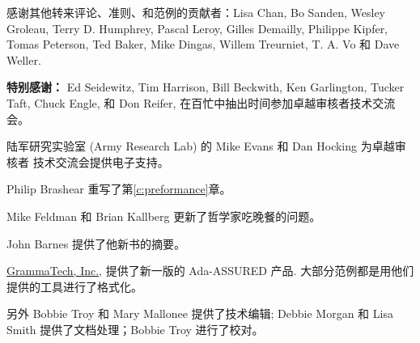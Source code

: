 感谢其他转来评论、准则、和范例的贡献者：Lisa Chan, Bo Sanden, Wesley Groleau,
Terry D. Humphrey, Pascal Leroy, Gilles Demailly, Philippe Kipfer, Tomas
Peterson, Ted Baker, Mike Dingas, Willem Treurniet, T. A. Vo 和 Dave Weller.

\textbf{特别感谢：} 
Ed Seidewitz, Tim Harrison, Bill Beckwith, Ken Garlington, Tucker Taft,
Chuck Engle, 和 Don Reifer, 在百忙中抽出时间参加卓越审核者技术交流会。

陆军研究实验室 (Army Research Lab) 的 Mike Evans 和 Dan Hocking 为卓越审核者
技术交流会提供电子支持。

Philip Brashear 重写了第\ref{c:preformance}章。

Mike Feldman 和 Brian Kallberg 更新了哲学家吃晚餐的问题。

John Barnes 提供了他新书的摘要。

\href{http://www.grammatech.com/}{GrammaTech, Inc.}, 提供了新一版的
Ada-ASSURED 产品. 大部分范例都是用他们提供的工具进行了格式化。

另外 Bobbie Troy 和 Mary Mallonee 提供了技术编辑; Debbie Morgan 和 Lisa Smith
提供了文档处理；Bobbie Troy 进行了校对。
